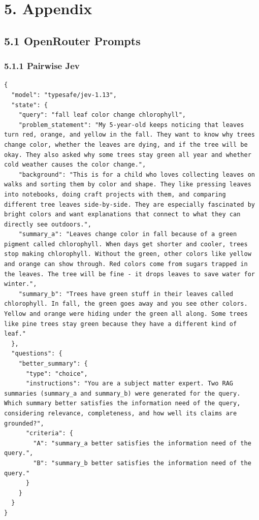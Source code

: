 \documentclass[
  10pt,
]{article}
\begin{document}
\section{5. Appendix}\label{appendix}

\subsection{5.1 OpenRouter Prompts}\label{openrouter-prompts}

\subsubsection{5.1.1 Pairwise Jev}\label{pairwise-jev-1}

\begin{lstlisting}
{
  "model": "typesafe/jev-1.13",
  "state": {
    "query": "fall leaf color change chlorophyll",
    "problem_statement": "My 5-year-old keeps noticing that leaves turn red, orange, and yellow in the fall. They want to know why trees change color, whether the leaves are dying, and if the tree will be okay. They also asked why some trees stay green all year and whether cold weather causes the color change.",
    "background": "This is for a child who loves collecting leaves on walks and sorting them by color and shape. They like pressing leaves into notebooks, doing craft projects with them, and comparing different tree leaves side-by-side. They are especially fascinated by bright colors and want explanations that connect to what they can directly see outdoors.",
    "summary_a": "Leaves change color in fall because of a green pigment called chlorophyll. When days get shorter and cooler, trees stop making chlorophyll. Without the green, other colors like yellow and orange can show through. Red colors come from sugars trapped in the leaves. The tree will be fine - it drops leaves to save water for winter.",
    "summary_b": "Trees have green stuff in their leaves called chlorophyll. In fall, the green goes away and you see other colors. Yellow and orange were hiding under the green all along. Some trees like pine trees stay green because they have a different kind of leaf."
  },
  "questions": {
    "better_summary": {
      "type": "choice",
      "instructions": "You are a subject matter expert. Two RAG summaries (summary_a and summary_b) were generated for the query. Which summary better satisfies the information need of the query, considering relevance, completeness, and how well its claims are grounded?",
      "criteria": {
        "A": "summary_a better satisfies the information need of the query.",
        "B": "summary_b better satisfies the information need of the query."
      }
    }
  }
}
\end{lstlisting}
\end{document}
